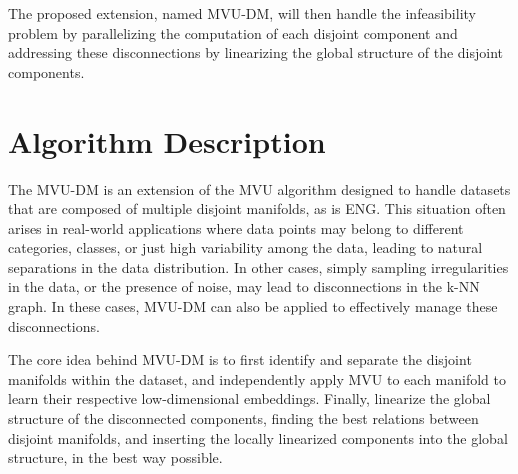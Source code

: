 The proposed extension, named \ac{MVU-DM}, will then handle the infeasibility problem by parallelizing the computation of each disjoint component and addressing these disconnections by linearizing the global structure of the disjoint components.

\section{Algorithm Description}
    The \ac{MVU-DM} is an extension of the \ac{MVU} algorithm designed to handle datasets that are composed of multiple disjoint manifolds, as is \ac{ENG}. This situation often arises in real-world applications where data points may belong to different categories, classes, or just high variability among the data, leading to natural separations in the data distribution. In other cases, simply sampling irregularities in the data, or the presence of noise, may lead to disconnections in the k-NN graph. In these cases, \ac{MVU-DM} can also be applied to effectively manage these disconnections.

    The core idea behind \ac{MVU-DM} is to first identify and separate the disjoint manifolds within the dataset, and independently apply \ac{MVU} to each manifold to learn their respective low-dimensional embeddings. Finally, linearize the global structure of the disconnected components, finding the best relations between disjoint manifolds, and inserting the locally linearized components into the global structure, in the best way possible.
            

